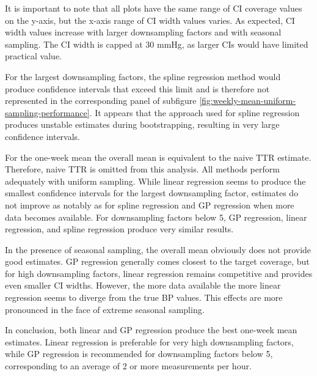 It is important to note that all plots have the same range of CI coverage values
on the y-axis, but the x-axis range of CI width values varies. As expected,
CI width values increase with larger downsampling factors and with seasonal sampling.
The CI width is capped at 30 mmHg, as larger CIs would have limited practical value.

For the largest downsampling factors, the spline regression method
would produce confidence intervals that exceed this limit and is therefore not
represented in the corresponding panel of subfigure
\ref{fig:weekly-mean-uniform-sampling-performance}.
It appears that the approach used for spline regression produces unstable
estimates during bootstrapping, resulting in very large confidence intervals.


For the one-week mean the overall mean is equivalent to the naive TTR estimate.
Therefore, naive TTR is omitted from this analysis.
All methods perform adequately with uniform sampling.
While linear regression seems to produce the smallest confidence intervals for
the largest downsampling factor, estimates do not improve as notably as for
spline regression and GP regression when more data becomes available.
For downsampling factors below 5, GP regression, linear regression, and spline
regression produce very similar results.

In the presence of seasonal sampling, the overall mean obviously does not
provide good estimates. GP regression generally
comes closest to the target coverage, but for high downsampling factors,
linear regression remains competitive and provides even smaller CI widths.
However, the more data available the more linear regression seems to
diverge from the true BP values. This effects are more pronounced in the face
of extreme seasonal sampling.


In conclusion, both linear and GP regression produce the best one-week mean estimates.
Linear regression is preferable for very high downsampling factors,
while GP regression is recommended for downsampling factors below 5,
corresponding to an average of 2 or more measurements per hour.

